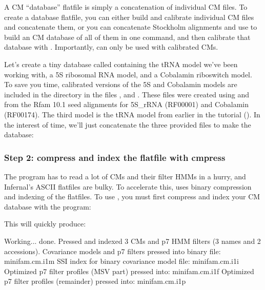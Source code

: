 A CM ``database'' flatfile is simply a concatenation of individual CM
files. To create a database flatfile, you can either build and
calibrate individual CM files and concatenate them, or you can
concatenate Stockholm alignments and use  to build an CM
database of all of them in one command, and then calibrate that
database with . Importantly,  can only
be used with calibrated CMs.

Let's create a tiny database called  containing the
tRNA model we've been working with, a 5S ribosomal RNA model, and a
Cobalamin riboswitch model. To save you time, calibrated versions of
the 5S and Cobalamin models are included in the 
directory in the files , and
. These files were created using 
and  from the Rfam 10.1 seed alignments for 5S\_rRNA
(RF00001) and Cobalamin (RF00174). The third model is the tRNA model
from earlier in the tutorial (). In the
interest of time, we'll just concatenate the three provided files to
make the database:


\subsubsection{Step 2: compress and index the flatfile with cmpress}

The  program has to read a lot of CMs and their filter
HMMs in a hurry, and Infernal's ASCII flatfiles are bulky. To
accelerate this,  uses binary compression and indexing of
the flatfiles.  To use , you must first compress and
index your CM database with the  program:


This will quickly produce:

\begin{sreoutput}
Working...    done.
Pressed and indexed 3 CMs and p7 HMM filters (3 names and 2 accessions).
Covariance models and p7 filters pressed into binary file:  minifam.cm.i1m
SSI index for binary covariance model file:                 minifam.cm.i1i
Optimized p7 filter profiles (MSV part)  pressed into:      minifam.cm.i1f
Optimized p7 filter profiles (remainder) pressed into:      minifam.cm.i1p
\end{sreoutput}

